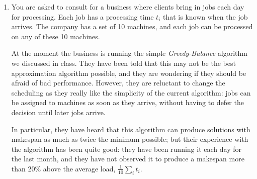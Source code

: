 \documentclass[12pt]{article}
\begin{document}
\begin{enumerate}
{\bf (b)} Show that the number of trucks used by this
algorithm is within a factor of $2$ of the minimum possible number,
for any set of weights and any value of $K$.





\item

You are asked to consult for a business where clients
bring in jobs each day for processing.
Each job has a processing time $t_i$ that is known when the
job arrives. The company has a set of 10 machines,
and each job can be processed on any of these 10 machines.

At the moment the business is running
the simple {\em Greedy-Balance} algorithm we discussed
in class. They have been told that this may not be the best
approximation algorithm possible, and they are wondering
if they should be afraid of bad performance.
However, they are reluctant to change the scheduling as they
really like the simplicity of the current algorithm:
jobs can be assigned to machines as soon as they arrive,
without having to defer the decision until later jobs arrive.

In particular, they have heard that this algorithm
can produce solutions with makespan as much as twice the minimum
possible; but their experience with the algorithm has been quite good:
they have been running it each day for the last
month, and they have not observed it to produce a
makespan more than 20\% above the average load,
$\frac{1}{10}\sum_i t_i$.


\end{enumerate}
\end{document}
